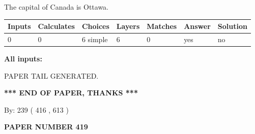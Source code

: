 \documentclass[12pt]{article}
\begin{document}
 
The capital of Canada is Ottawa.
 
 
\noindent{}
 
 
   
   
   
   
\noindent\begin{tabular}{|l|l|l|l|l|l|l|}
 \hline
Inputs & Calculates & Choices & Layers & Matches & Answer & Solution \\ \hline
 0  & 
 0  & 
 6
  simple  
  & 
 6  & 
 0  & 
  yes & 
  no 
  \\ \hline
 \end{tabular}
   
   
   
   
\noindent{}
   
   
   
   
\noindent\vspace{0.1in}\hspace{-0.08in} {\textbf{\Large{All inputs: }}}
   
   
   
   
   
   
 \vspace{0.2in}
 
   
   
\vspace{2.0in} PAPER TAIL GENERATED.
   
   
   
   
\vspace{1.0in} 
{\textbf{\large{ *** END OF PAPER, THANKS *** }}} 
   
   
\hspace{1.0in} By: 
 239 ( 416 ,  613 )
   
   
   
   
\newpage 
\setcounter{page}{ 
   419001 } 
   
   
   
   
 {\textbf{ \Large{ PAPER NUMBER  419  }}}
   
   
\vspace{0.2in}
   
   
   
   
   
   
   
\end{document}
